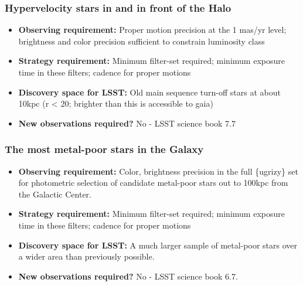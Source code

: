 \subsubsection{Hypervelocity stars in and in front of the Halo}

\begin{itemize}
\item {\bf Observing requirement:} Proper motion precision at the 1 mas/yr level; brightness and color precision sufficient to constrain luminosity class
\vspace{-2mm}

\item {\bf Strategy requirement:} Minimum filter-set required; minimum exposure time in these filters; cadence for proper motions
\vspace{-2mm}

\item {\bf Discovery space for LSST:} Old main sequence turn-off stars at about 10kpc (r < 20; brighter than this is accessible to gaia)
\vspace{-2mm}

\item {\bf New observations required?} No - LSST science book 7.7
\vspace{-2mm}
\end{itemize}

\subsubsection{The most metal-poor stars in the Galaxy}

\begin{itemize}
\item {\bf Observing requirement:} Color, brightness precision in the full \{ugrizy\} set for photometric selection of candidate metal-poor stars out to 100kpc from the Galactic Center.
\vspace{-2mm}

\item {\bf Strategy requirement:} Minimum filter-set required; minimum exposure time in these filters; cadence for proper motions
\vspace{-2mm}

\item {\bf Discovery space for LSST:} A much larger sample of metal-poor stars over a wider area than previously possible.
\vspace{-2mm}

\item {\bf New observations required?} No - LSST science book 6.7.
\vspace{-2mm}
\end{itemize}

